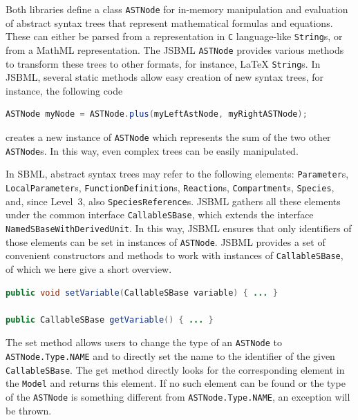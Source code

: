 Both libraries define a class \texttt{ASTNode}
for in-memory manipulation and evaluation of abstract syntax trees that represent
mathematical formulas and equations. These can either be parsed from a representation in \texttt{C}
language-like \texttt{String}s, or from a MathML representation. The JSBML
\texttt{ASTNode} provides various methods to transform these trees to other
formats, for instance, \LaTeX{}
 \texttt{String}s. In JSBML, several static
methods allow easy creation of new syntax trees, for instance, the following
code
\begin{lstlisting}[language=Java,numbers=none]
ASTNode myNode = ASTNode.plus(myLeftAstNode, myRightASTNode);
\end{lstlisting}
creates a new instance of \texttt{ASTNode} which represents the sum of the two
other \texttt{ASTNode}s. In this way, even complex trees can be easily
manipulated.

In SBML, abstract syntax trees may refer to the following elements:
\texttt{Parameter}s, \texttt{LocalParameter}s, \texttt{FunctionDefinition}s,
\texttt{Reaction}s, \texttt{Compartment}s, \texttt{Species}, and, since Level~3,
also \texttt{SpeciesReference}s. JSBML gathers all these elements under the
common interface \texttt{CallableSBase},
%
%
which extends the interface \texttt{NamedSBaseWithDerivedUnit}.
%
%
In this way, JSBML ensures that only identifiers of those elements can be set in
instances of \texttt{ASTNode}.
%
JSBML provides a set of convenient constructors and methods to work with
instances of \texttt{CallableSBase},
%
%
of which we here give a short overview.
\begin{lstlisting}[language=Java,numbers=none,float=h,captionpos=t,
title={Getter and setter:}]
public void setVariable(CallableSBase variable) { ... }

public CallableSBase getVariable() { ... }
\end{lstlisting}
The set method allows users to change the type of an \texttt{ASTNode} to
\texttt{ASTNode.Type.NAME}
%
and to directly set the name to the identifier of the
given \texttt{CallableSBase}.
%
%
The get method directly looks for the corresponding element in the \texttt{Model}
%
and returns this element. If no such element can be found or the type of the
\texttt{ASTNode} is something different from \texttt{ASTNode.Type.NAME}, an
%
%
exception will be thrown.

